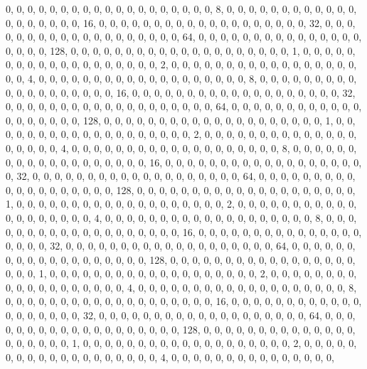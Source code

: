 \begin{DoxyCode}
       0, 0, 0, 0, 0, 0, 0, 0, 0, 0, 0, 0, 0, 0, 0, 0, 0, 0, 0, 8, 0, 0, 0, 0, 0, 0, 0, 0, 0, 0, 0, 0, 0, 0, 0, 0,
       0, 0, 0, 16, 0, 0, 0, 0, 0, 0, 0, 0, 0, 0, 0, 0, 0, 0, 0, 0, 0, 0, 0, 32, 0, 0, 0, 0, 0, 0, 0, 0, 0, 0, 0,
       0, 0, 0, 0, 0, 0, 0, 0, 64, 0, 0, 0, 0, 0, 0, 0, 0, 0, 0, 0, 0, 0, 0, 0, 0, 0, 0, 0, 128, 0, 0, 0, 0, 0, 0,
       0, 0, 0, 0, 0, 0, 0, 0, 0, 0, 0, 0, 0, 0, 1, 0, 0, 0, 0, 0, 0, 0, 0, 0, 0, 0, 0, 0, 0, 0, 0, 0, 0, 0, 2, 0,
       0, 0, 0, 0, 0, 0, 0, 0, 0, 0, 0, 0, 0, 0, 0, 0, 0, 0, 4, 0, 0, 0, 0, 0, 0, 0, 0, 0, 0, 0, 0, 0, 0, 0, 0, 0,
       0, 0, 8, 0, 0, 0, 0, 0, 0, 0, 0, 0, 0, 0, 0, 0, 0, 0, 0, 0, 0, 0, 16, 0, 0, 0, 0, 0, 0, 0, 0, 0, 0, 0, 0, 0,
       0, 0, 0, 0, 0, 0, 32, 0, 0, 0, 0, 0, 0, 0, 0, 0, 0, 0, 0, 0, 0, 0, 0, 0, 0, 0, 64, 0, 0, 0, 0, 0, 0, 0, 0,
       0, 0, 0, 0, 0, 0, 0, 0, 0, 0, 0, 128, 0, 0, 0, 0, 0, 0, 0, 0, 0, 0, 0, 0, 0, 0, 0, 0, 0, 0, 0, 0, 1, 0, 0, 0,
       0, 0, 0, 0, 0, 0, 0, 0, 0, 0, 0, 0, 0, 0, 0, 0, 2, 0, 0, 0, 0, 0, 0, 0, 0, 0, 0, 0, 0, 0, 0, 0, 0, 0, 0, 0,
       4, 0, 0, 0, 0, 0, 0, 0, 0, 0, 0, 0, 0, 0, 0, 0, 0, 0, 0, 0, 8, 0, 0, 0, 0, 0, 0, 0, 0, 0, 0, 0, 0, 0, 0, 0,
       0, 0, 0, 0, 16, 0, 0, 0, 0, 0, 0, 0, 0, 0, 0, 0, 0, 0, 0, 0, 0, 0, 0, 0, 32, 0, 0, 0, 0, 0, 0, 0, 0, 0, 0,
       0, 0, 0, 0, 0, 0, 0, 0, 0, 64, 0, 0, 0, 0, 0, 0, 0, 0, 0, 0, 0, 0, 0, 0, 0, 0, 0, 0, 0, 128, 0, 0, 0, 0, 0,
       0, 0, 0, 0, 0, 0, 0, 0, 0, 0, 0, 0, 0, 0, 0, 1, 0, 0, 0, 0, 0, 0, 0, 0, 0, 0, 0, 0, 0, 0, 0, 0, 0, 0, 0, 2,
       0, 0, 0, 0, 0, 0, 0, 0, 0, 0, 0, 0, 0, 0, 0, 0, 0, 0, 0, 4, 0, 0, 0, 0, 0, 0, 0, 0, 0, 0, 0, 0, 0, 0, 0, 0,
       0, 0, 0, 8, 0, 0, 0, 0, 0, 0, 0, 0, 0, 0, 0, 0, 0, 0, 0, 0, 0, 0, 0, 16, 0, 0, 0, 0, 0, 0, 0, 0, 0, 0, 0, 0,
       0, 0, 0, 0, 0, 0, 0, 32, 0, 0, 0, 0, 0, 0, 0, 0, 0, 0, 0, 0, 0, 0, 0, 0, 0, 0, 0, 64, 0, 0, 0, 0, 0, 0, 0,
       0, 0, 0, 0, 0, 0, 0, 0, 0, 0, 0, 0, 128, 0, 0, 0, 0, 0, 0, 0, 0, 0, 0, 0, 0, 0, 0, 0, 0, 0, 0, 0, 0, 1, 0,
       0, 0, 0, 0, 0, 0, 0, 0, 0, 0, 0, 0, 0, 0, 0, 0, 0, 0, 2, 0, 0, 0, 0, 0, 0, 0, 0, 0, 0, 0, 0, 0, 0, 0, 0, 0,
       0, 0, 4, 0, 0, 0, 0, 0, 0, 0, 0, 0, 0, 0, 0, 0, 0, 0, 0, 0, 0, 0, 8, 0, 0, 0, 0, 0, 0, 0, 0, 0, 0, 0, 0, 0,
       0, 0, 0, 0, 0, 0, 16, 0, 0, 0, 0, 0, 0, 0, 0, 0, 0, 0, 0, 0, 0, 0, 0, 0, 0, 0, 32, 0, 0, 0, 0, 0, 0, 0, 0, 0,
       0, 0, 0, 0, 0, 0, 0, 0, 0, 0, 64, 0, 0, 0, 0, 0, 0, 0, 0, 0, 0, 0, 0, 0, 0, 0, 0, 0, 0, 0, 128, 0, 0, 0, 0,
       0, 0, 0, 0, 0, 0, 0, 0, 0, 0, 0, 0, 0, 0, 0, 0, 1, 0, 0, 0, 0, 0, 0, 0, 0, 0, 0, 0, 0, 0, 0, 0, 0, 0, 0, 0,
       2, 0, 0, 0, 0, 0, 0, 0, 0, 0, 0, 0, 0, 0, 0, 0, 0, 0, 0, 0, 4, 0, 0, 0, 0, 0, 0, 0, 0, 0, 0, 0, 0, 0, 0, 0,

\end{DoxyCode}

